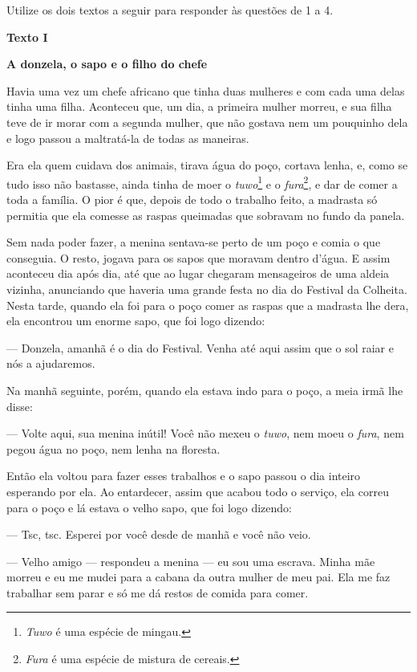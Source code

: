Utilize os dois textos a seguir para responder às questões de 1 a 4.

\begin{myquote}
\begin{center}
\textbf{Texto I}

\textbf{A donzela, o sapo e o filho do chefe}
\end{center}
\medskip

\noindent Havia uma vez um chefe africano que tinha duas mulheres e com cada uma
delas tinha uma filha. Aconteceu que, um dia, a primeira mulher morreu,
e sua filha teve de ir morar com a segunda mulher, que não gostava nem
um pouquinho dela e logo passou a maltratá-la de todas as maneiras.

Era ela quem cuidava dos animais, tirava água do poço, cortava lenha, e,
como se tudo isso não bastasse, ainda tinha de moer o
\emph{tuwo}\footnote{\emph{Tuwo} é uma espécie de mingau.} e o \emph{fura}\footnote{\emph{Fura} é uma espécie de mistura de cereais.}, e dar de comer a
toda a família. O pior é que, depois de todo o trabalho feito, a
madrasta só permitia que ela comesse as raspas queimadas que sobravam no
fundo da panela.

Sem nada poder fazer, a menina sentava-se perto de um poço e comia o que
conseguia. O resto, jogava para os sapos que moravam dentro d'água. E
assim aconteceu dia após dia, até que ao lugar chegaram mensageiros de
uma aldeia vizinha, anunciando que haveria uma grande festa no dia do
Festival da Colheita. Nesta tarde, quando ela foi para o poço comer as
raspas que a madrasta lhe dera, ela encontrou um enorme sapo, que foi
logo dizendo:

— Donzela, amanhã é o dia do Festival. Venha até aqui assim que o sol
raiar e nós a ajudaremos.

Na manhã seguinte, porém, quando ela estava indo para o poço, a meia
irmã lhe disse:

— Volte aqui, sua menina inútil! Você não mexeu o \emph{tuwo}, nem moeu
o \emph{fura}, nem pegou água no poço, nem lenha na floresta.

Então ela voltou para fazer esses trabalhos e o sapo passou o dia
inteiro esperando por ela. Ao entardecer, assim que acabou todo o
serviço, ela correu para o poço e lá estava o velho sapo, que foi logo
dizendo:

— Tsc, tsc. Esperei por você desde de manhã e você não veio.

— Velho amigo — respondeu a menina — eu sou uma escrava. Minha mãe
morreu e eu me mudei para a cabana da outra mulher de meu pai. Ela me
faz trabalhar sem parar e só me dá restos de comida para comer.


\end{myquote}
